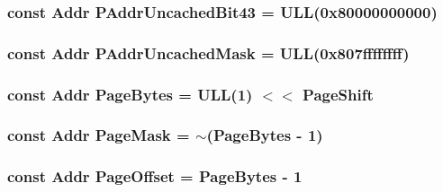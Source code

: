\label{namespaceAlphaISA_a49418c464b9c2fec6cdcbd0bc558d14c}
\hypertarget{namespaceAlphaISA_ac252afca5e58f1a1873328793f69804c}{
\subsubsection[{PAddrUncachedBit43}]{\setlength{\rightskip}{0pt plus 5cm}const {\bf Addr} {\bf PAddrUncachedBit43} = ULL(0x80000000000)}}
\label{namespaceAlphaISA_ac252afca5e58f1a1873328793f69804c}
\hypertarget{namespaceAlphaISA_a0560c6f813b1ab48a8790c503feb1158}{
\subsubsection[{PAddrUncachedMask}]{\setlength{\rightskip}{0pt plus 5cm}const {\bf Addr} {\bf PAddrUncachedMask} = ULL(0x807ffffffff)}}
\label{namespaceAlphaISA_a0560c6f813b1ab48a8790c503feb1158}
\hypertarget{namespaceAlphaISA_ad9d6a4d965e107c9a7214f096107296b}{
\subsubsection[{PageBytes}]{\setlength{\rightskip}{0pt plus 5cm}const {\bf Addr} {\bf PageBytes} = ULL(1) $<$$<$ {\bf PageShift}}}
\label{namespaceAlphaISA_ad9d6a4d965e107c9a7214f096107296b}
\hypertarget{namespaceAlphaISA_acd1e88c82c4d48223a490f4d235ced74}{
\subsubsection[{PageMask}]{\setlength{\rightskip}{0pt plus 5cm}const {\bf Addr} {\bf PageMask} = $\sim$({\bf PageBytes} -\/ 1)}}
\label{namespaceAlphaISA_acd1e88c82c4d48223a490f4d235ced74}
\hypertarget{namespaceAlphaISA_a51e1064f1269394dc26702651be5061f}{
\subsubsection[{PageOffset}]{\setlength{\rightskip}{0pt plus 5cm}const {\bf Addr} {\bf PageOffset} = {\bf PageBytes} -\/ 1}}
